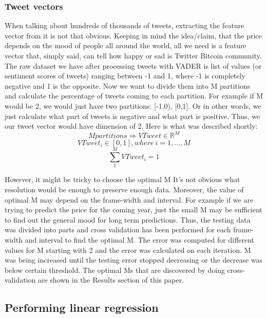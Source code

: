 \documentclass[a4paper,11pt,oneside]{article}
\begin{document}
  \subsubsection{Tweet vectors}\label{tweetvectors}
  
  When talking about hundreds of thousands of tweets, extracting the feature vector from it is not that obvious. Keeping in mind the idea/claim, that the price depends on the mood of people all around the world, all we need is a feature vector that, simply said, can tell how happy or sad is Twitter Bitcoin community. The raw dataset we have after processing tweets with VADER is list of values (or sentiment scores of tweets) ranging between -1 and 1, where -1 is completely negative and 1 is the opposite. Now we want to divide them into M partitions and calculate the percentage of tweets coming to each partition. For example if M would be 2, we would just have two partitions: [-1,0), [0,1]. Or in other words, we just calculate what part of tweets is negative and what part is positive. Thus, we our tweet vector would have dimension of 2. Here is what was described shortly:
  \begin{equation}\label{partitionsInTweetVector}
	  M partitions \Rightarrow VTweet \in \mathbb{R}^M 
  \end{equation}
  \begin{equation}
	  VTweet_i \in [0, 1], where\ i = 1,..., M
  \end{equation}
  \begin{equation}
	  \sum_{1}^{M} VTweet_i = 1
  \end{equation}
	  
  However, it might be tricky to choose the optimal M It’s not obvious what resolution would be enough to preserve enough data. Moreover, the value of optimal M may depend on the frame-width and interval. For example if we are trying to predict the price for the coming year, just the small M may be sufficient to find out the general mood for long term predictions. Thus, the testing data was divided into parts and cross validation has been performed for each frame-width and interval to find the optimal M. The error was computed for different values for M starting with 2 and the error was calculated on each iteration. M was being increased until the testing error stopped decreasing or the decrease was below certain threshold. The optimal Ms that are discovered by doing cross-validation are shown in the Results section of this paper.
  
  
  \subsection{Performing linear regression}
  
\end{document}
